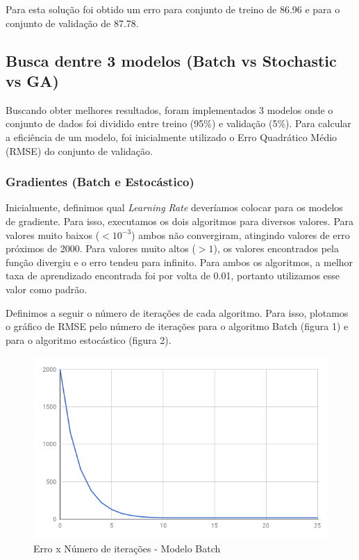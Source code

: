 \documentclass[conference]{IEEEtran}
\begin{document}
Para esta solução foi obtido um erro para conjunto de treino de 86.96 e para o conjunto de validação de 87.78. 

\subsection{Busca dentre 3 modelos (Batch vs Stochastic vs GA)}
Buscando obter melhores resultados, foram implementados 3 modelos onde o conjunto de dados foi dividido entre treino (95\%) e validação (5\%). Para calcular a eficiência de um modelo, foi inicialmente utilizado o Erro Quadrático Médio (RMSE) do conjunto de validação.

\subsubsection{Gradientes (Batch e Estocástico)}

Inicialmente, definimos qual {\it Learning Rate} deveríamos colocar para os modelos de gradiente. Para isso, executamos os dois algoritmos para diversos valores. Para valores muito baixos ($< 10^{-3}$) ambos não convergiram, atingindo valores de erro próximos de 2000. Para valores muito altos ($> 1$), os valores encontrados pela função divergiu e o erro tendeu para infinito. Para ambos os algoritmos, a melhor taxa de aprendizado encontrada foi por volta de 0.01, portanto utilizamos esse valor como padrão. 

Definimos a seguir o número de iterações de cada algoritmo. Para isso, plotamos o gráfico de RMSE pelo número de iterações para o algoritmo Batch (figura 1) e para o algoritmo estocástico (figura 2).


\begin{figure}[h!]
	\includegraphics[scale=0.4]{batch.png}
	\caption{Erro x Número de iterações - Modelo Batch}
	\label{fig:batch}
\end{figure}
\end{document}
